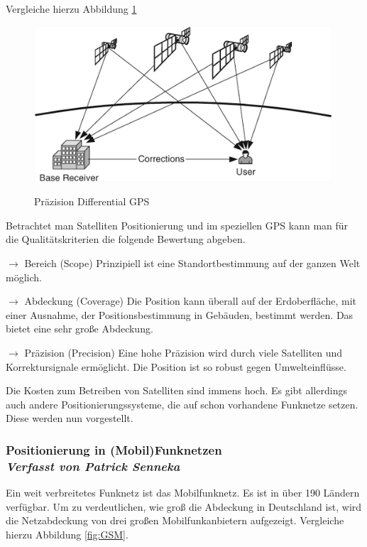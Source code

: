 Vergleiche hierzu Abbildung \ref{fig:DGPS}
\begin{figure}[h]
\centering
\includegraphics[width=0.99\textwidth]{ref/images/DGPS.PNG}
\caption[Präzision Differential GPS]{Präzision Differential GPS}
\label{fig:DGPS}
\cite[S. 196]{Schiller2004}
\end{figure}

Betrachtet man Satelliten Positionierung und im speziellen GPS kann man für die Qualitätskriterien die folgende Bewertung abgeben.

$\longrightarrow$ Bereich (Scope) Prinzipiell ist eine Standortbestimmung auf der ganzen Welt möglich.

$\longrightarrow$ Abdeckung (Coverage) Die Position kann überall auf der Erdoberfläche, mit einer Ausnahme, der Positionsbestimmung in Gebäuden, bestimmt werden. Das bietet eine sehr große Abdeckung.

$\longrightarrow$ Präzision (Precision) Eine hohe Präzision wird durch viele Satelliten und Korrektursignale ermöglicht. Die Position ist so  robust gegen Umwelteinflüsse.

\cite[S. 187]{Schiller2004}

Die Kosten zum Betreiben von Satelliten sind immens hoch. Es gibt allerdings auch andere Positionierungssysteme, die auf schon vorhandene Funknetze setzen. Diese werden nun vorgestellt.

\subsubsection[Positionierung in (Mobil)Funknetzen]{Positionierung in (Mobil)Funknetzen
 \\ \textnormal{\small{\textit {Verfasst von Patrick Senneka}}}}

Ein weit verbreitetes Funknetz ist das Mobilfunknetz. Es ist in über 190 Ländern verfügbar.\cite[206]{Schiller2004} Um zu verdeutlichen, wie groß die Abdeckung in Deutschland ist, wird die Netzabdeckung von drei großen Mobilfunkanbietern aufgezeigt. Vergleiche hierzu Abbildung \ref{fig:GSM}.

